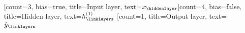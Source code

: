\documentclass{standalone}
\begin{document}
    \begin{neuralnetwork}[height=4]
        \newcommand{\x}[2]{$x_#2$}
        \newcommand{\y}[2]{$\hat{y}_#2$}
        \newcommand{\hfirst}[2]{\small $h^{(1)}_#2$}
        \newcommand{\hsecond}[2]{\small $h^{(2)}_#2$}
        [count=3, bias=true, title=Input layer, text=\x]
        \hiddenlayer[count=4, bias=false, title=Hidden layer, text=\hfirst] \linklayers
        \outputlayer[count=1, title=Output layer, text=\y] \linklayers
    \end{neuralnetwork}
\end{document}
